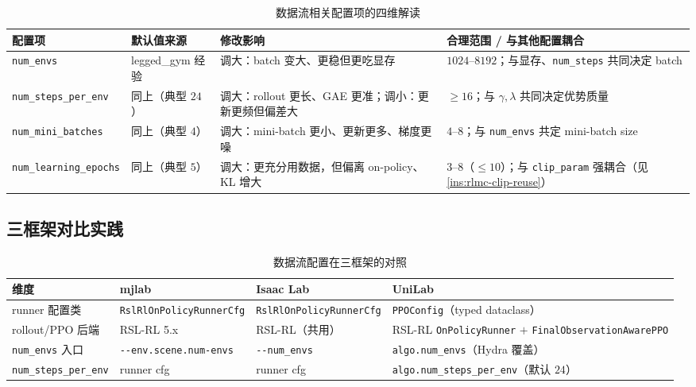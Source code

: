 \begin{table}[H]
\centering
\caption{数据流相关配置项的四维解读}
\label{tab:rlmc-dataflow-cfg}
\begin{tabular}{p{2.9cm}p{2.4cm}p{3.0cm}p{3.4cm}}
\hline
配置项 & 默认值来源 & 修改影响 & 合理范围 / 与其他配置耦合 \\
\hline
\verb|num_envs| & legged\_gym 经验 \cite{rudin2022legged} & 调大：batch 变大、更稳但更吃显存 & $1024$--$8192$；与显存、\verb|num_steps| 共同决定 batch \\
\verb|num_steps_per_env| & 同上（典型 $24$） & 调大：rollout 更长、GAE 更准；调小：更新更频但偏差大 & $\ge16$；与 $\gamma,\lambda$ 共同决定优势质量 \\
\verb|num_mini_batches| & 同上（典型 $4$） & 调大：mini-batch 更小、更新更多、梯度更噪 & $4$--$8$；与 \verb|num_envs| 共定 mini-batch size \\
\verb|num_learning_epochs| & 同上（典型 $5$） & 调大：更充分用数据，但偏离 on-policy、KL 增大 & $3$--$8$（$\le10$）；与 \verb|clip_param| 强耦合（见 \cref{ins:rlmc-clip-reuse}） \\
\hline
\end{tabular}
\end{table}

\subsection{三框架对比实践}

\begin{table}[H]
\centering
\caption{数据流配置在三框架的对照}
\label{tab:rlmc-dataflow-3fw}
\begin{tabular}{llll}
\hline
维度 & mjlab & Isaac Lab & UniLab \\
\hline
runner 配置类 & \verb|RslRlOnPolicyRunnerCfg| & \verb|RslRlOnPolicyRunnerCfg| & \verb|PPOConfig|（typed dataclass） \\
rollout/PPO 后端 & RSL-RL 5.x & RSL-RL（共用） & RSL-RL \verb|OnPolicyRunner| $+$ \verb|FinalObservationAwarePPO| \\
\verb|num_envs| 入口 & \verb|--env.scene.num-envs| & \verb|--num_envs| & \verb|algo.num_envs|（Hydra 覆盖） \\
\verb|num_steps_per_env| & runner cfg & runner cfg & \verb|algo.num_steps_per_env|（默认 $24$） \\
\hline
\end{tabular}
\end{table}

